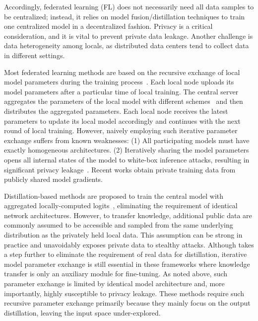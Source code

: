 \documentclass[letterpaper]{article} %
\begin{document}
Accordingly, federated learning (FL) does not necessarily need all data samples to be centralized; instead, it relies on model fusion/distillation techniques to train one centralized model in a decentralized fashion. Privacy is a critical consideration, and it is vital to prevent private data leakage. Another challenge is data heterogeneity among locals, as distributed data centers tend to collect data in different settings.

Most federated learning methods are based on the recursive exchange of local model parameters during the training process~\cite{mcmahan2017communication, li2018federated, karimireddy2019scaffold}. Each local node uploads its model parameters after a particular time of local training. The central server aggregates the parameters of the local model with different schemes~\cite{wang2020federated, li2019fair, hsu2020federated} and then distributes the aggregated parameters. Each local node receives the latest parameters to update its local model accordingly and continues with the next round of local training.
However, naively employing such iterative parameter exchange suffers from known weaknesses: (1) All participating models must have exactly homogeneous architectures. (2) Iteratively sharing the model parameters opens all internal states of the model to white-box inference attacks, resulting in significant privacy leakage~\cite{chang2019cronus}. Recent works \cite{zhu2019deep, geiping2020inverting} obtain private training data from publicly shared model gradients.





Distillation-based methods are proposed to train the central model with aggregated locally-computed logits~\cite{li2019fedmd, lin2020ensemble, gong2022preserving}, eliminating the requirement of identical network architectures. %
However, to transfer knowledge, additional public data are commonly assumed to be accessible and sampled from the same underlying distribution as the privately held local data.
This assumption can be strong in practice and unavoidably exposes private data to stealthy attacks. %
Although \cite{zhu2021data, zhang2022fedzkt, zhang2022fine} takes a step further to eliminate the requirement of real data for distillation, iterative model parameter exchange is still essential in these frameworks where knowledge transfer is only an auxiliary module for fine-tuning. As noted above, such parameter exchange is limited by identical model architecture and, more importantly, highly susceptible to privacy leakage.
These methods require such recursive parameter exchange primarily because they mainly focus on the output distillation, leaving the input space under-explored.
\end{document}
